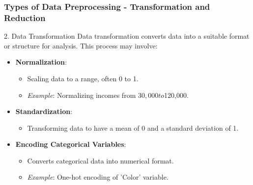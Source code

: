 \documentclass{beamer}
\begin{document}
\begin{frame}[fragile]
    \frametitle{Types of Data Preprocessing - Transformation and Reduction}
    \begin{block}{2. Data Transformation}
        Data transformation converts data into a suitable format or structure for analysis. This process may involve:
        \begin{itemize}
            \item \textbf{Normalization}:
                \begin{itemize}
                    \item Scaling data to a range, often 0 to 1.
                    \item \textit{Example}: Normalizing incomes from $30,000 to $120,000.
                \end{itemize}

            \item \textbf{Standardization}:
                \begin{itemize}
                    \item Transforming data to have a mean of 0 and a standard deviation of 1.
                \end{itemize}

            \item \textbf{Encoding Categorical Variables}:
                \begin{itemize}
                    \item Converts categorical data into numerical format.
                    \item \textit{Example}: One-hot encoding of 'Color' variable.
                \end{itemize}
        \end{itemize}
    \end{block}
    

\end{frame}
\end{document}
